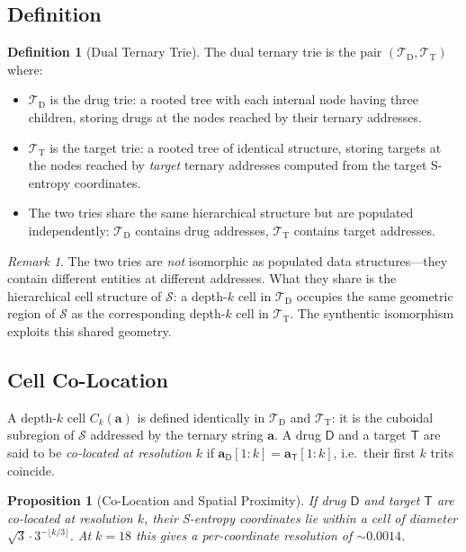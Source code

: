 \documentclass[11pt,twocolumn,a4paper]{article}
\newtheorem{proposition}[theorem]{Proposition}
\theoremstyle{definition}
\newtheorem{definition}[theorem]{Definition}
\theoremstyle{remark}
\newtheorem{remark}[theorem]{Remark}
\newcommand{\Sspace}{\mathcal{S}}
\newcommand{\Trie}{\mathcal{T}}
\newcommand{\Dtrie}{\Trie_{\mathrm{D}}}
\newcommand{\Ttrie}{\Trie_{\mathrm{T}}}
\newcommand{\Drug}{\mathsf{D}}
\newcommand{\Target}{\mathsf{T}}
\newcommand{\drugaddr}{\mathbf{a}_\Drug}
\newcommand{\targaddr}{\mathbf{a}_\Target}
\begin{document}
\subsection{Definition}

\begin{definition}[Dual Ternary Trie]
\label{def:dual_trie}
The dual ternary trie is the pair $(\Dtrie, \Ttrie)$ where:
\begin{itemize}[nosep,leftmargin=*]
\item $\Dtrie$ is the drug trie: a rooted tree with each internal node having three children, storing drugs at the nodes reached by their ternary addresses.
\item $\Ttrie$ is the target trie: a rooted tree of identical structure, storing targets at the nodes reached by \emph{target} ternary addresses computed from the target S-entropy coordinates.
\item The two tries share the same hierarchical structure but are populated independently: $\Dtrie$ contains drug addresses, $\Ttrie$ contains target addresses.
\end{itemize}
\end{definition}

\begin{remark}
The two tries are \emph{not} isomorphic as populated data structures---they contain different entities at different addresses. What they share is the hierarchical cell structure of $\Sspace$: a depth-$k$ cell in $\Dtrie$ occupies the same geometric region of $\Sspace$ as the corresponding depth-$k$ cell in $\Ttrie$. The synthentic isomorphism exploits this shared geometry.
\end{remark}

\subsection{Cell Co-Location}

A depth-$k$ cell $C_k(\mathbf{a})$ is defined identically in $\Dtrie$ and $\Ttrie$: it is the cuboidal subregion of $\Sspace$ addressed by the ternary string $\mathbf{a}$. A drug $\Drug$ and a target $\Target$ are said to be \emph{co-located at resolution $k$} if $\drugaddr[1:k] = \targaddr[1:k]$, i.e.\ their first $k$ trits coincide.

\begin{proposition}[Co-Location and Spatial Proximity]
\label{prop:colocation}
If drug $\Drug$ and target $\Target$ are co-located at resolution $k$, their S-entropy coordinates lie within a cell of diameter $\sqrt{3} \cdot 3^{-\lfloor k/3 \rfloor}$. At $k = 18$ this gives a per-coordinate resolution of $\sim\!0.0014$.
\end{proposition}
\end{document}
